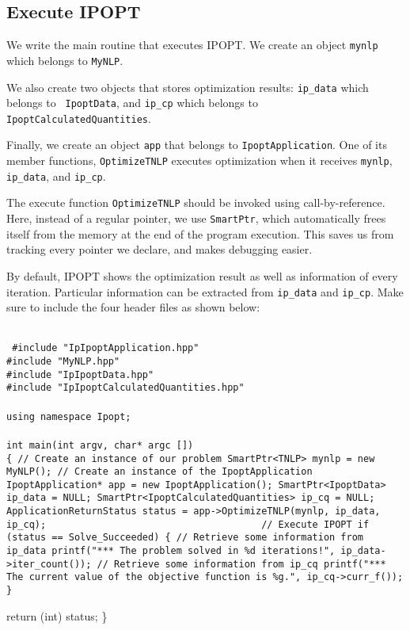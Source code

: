 \documentclass[letter,12pt]{article}
\begin{document}
\subsection{Execute IPOPT}
We write
the main routine that executes IPOPT. We create an object {\tt mynlp} 
which belongs to {\tt MyNLP}.\par
We also create two objects that stores optimization
results: {\tt ip\_data} which belongs to {\tt
IpoptData}, and {\tt ip\_cp} which belongs to {\tt IpoptCalculatedQuantities}.\par
Finally, we create an object {\tt app} that belongs to {\tt IpoptApplication}. One of
its member functions, {\tt OptimizeTNLP} executes optimization when it
receives {\tt mynlp}, {\tt ip\_data}, and {\tt ip\_cp}. \par
The execute function {\tt OptimizeTNLP} should be invoked using call-by-reference.
Here, instead of a regular pointer, we use {\tt SmartPtr}, which automatically
frees itself from the memory at the end of the program execution. 
This saves us from tracking every pointer we declare, and makes debugging easier.\par
 By default, IPOPT
shows the optimization result as well as information
of every iteration. Particular information can be extracted 
from {\tt ip\_data} and {\tt ip\_cp}.
Make sure to include the four header files as shown below:\\\\
\begin{small}
{\tt
\#include "IpIpoptApplication.hpp"\\
\#include "MyNLP.hpp"\\
\#include "IpIpoptData.hpp"\\
\#include "IpIpoptCalculatedQuantities.hpp"\\
\\
using namespace Ipopt;\\
\\
int main(int argv, char* argc [])\\
\{
{\subitem}   // Create an instance of our problem
{\subitem}   SmartPtr<TNLP> mynlp = new MyNLP();
{\subitem}     // Create an instance of the IpoptApplication
{\subitem}   IpoptApplication* app = new IpoptApplication();
{\subitem}
{\subitem}   SmartPtr<IpoptData> ip\_data = NULL;
{\subitem}   SmartPtr<IpoptCalculatedQuantities> ip\_cq = NULL;
{\subitem}   ApplicationReturnStatus status = app->OptimizeTNLP(mynlp,
 ip\_data, ip\_cq);
{\subitem}~~~~~~~~~~~~~~~~~~~~~~~~~~~~~~~~~~~~~// Execute IPOPT
{\subitem}   if (status == Solve\_Succeeded) \{
{\subsubitem}     // Retrieve some information from ip\_data
{\subsubitem}     printf("*** The problem solved in \%d iterations!", ip\_data->iter\_count()); 
{\subsubitem}     // Retrieve some information from ip\_cq
{\subsubitem}     printf("*** The current value of the objective function is \%g.", ip\_cq->curr\_f());
{\subsubitem}   \}

{\subitem}   return (int) status;
\}
}\\\\
\end{small}
\end{document}

